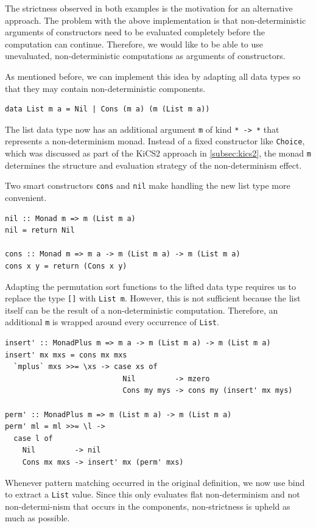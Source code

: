 \documentclass[a4paper, 11pt, fleqn, twoside, abstract=on]{scrreprt}
\newcommand{\hinl}[1]{\texttt{#1}}
\begin{document}
The strictness observed in both examples is the motivation for an alternative approach.
The problem with the above implementation is that non-deterministic arguments of constructors need to be evaluated completely before the computation can continue.
Therefore, we would like to be able to use unevaluated, non-deterministic computations as arguments of constructors.

As mentioned before, we can implement this idea by adapting all data types so that they may contain non-deterministic components.

\begin{verbatim}
data List m a = Nil | Cons (m a) (m (List m a))
\end{verbatim}
\noindent
The list data type now has an additional argument \hinl{m} of kind \hinl{* -> *} that represents a non-determinism monad.
Instead of a fixed constructor like \hinl{Choice}, which was discussed as part of the KiCS2 approach in \autoref{subsec:kics2}, the monad \hinl{m} determines the structure and evaluation strategy of the non-determinism effect.

Two smart constructors \hinl{cons} and \hinl{nil} make handling the new list type more convenient.

\begin{verbatim}
nil :: Monad m => m (List m a)
nil = return Nil

cons :: Monad m => m a -> m (List m a) -> m (List m a)
cons x y = return (Cons x y)
\end{verbatim}

Adapting the permutation sort functions to the lifted data type requires us to replace the type \hinl{[]} with \hinl{List m}.
However, this is not sufficient because the list itself can be the result of a non-deterministic computation.
Therefore, an additional \hinl{m} is wrapped around every occurrence of \hinl{List}.

\begin{verbatim}
insert' :: MonadPlus m => m a -> m (List m a) -> m (List m a)
insert' mx mxs = cons mx mxs
  `mplus` mxs >>= \xs -> case xs of
                           Nil         -> mzero
                           Cons my mys -> cons my (insert' mx mys)

perm' :: MonadPlus m => m (List m a) -> m (List m a)
perm' ml = ml >>= \l ->
  case l of
    Nil         -> nil
    Cons mx mxs -> insert' mx (perm' mxs)
\end{verbatim}

Whenever pattern matching occurred in the original definition, we now use bind to extract a \hinl{List} value.
Since this only evaluates flat non-determinism and not non-determi-nism that occurs in the components, non-strictness is upheld as much as possible.
\end{document}
